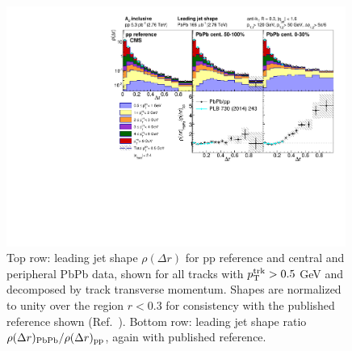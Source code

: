 \begin{figure}[h!]
\begin{center} 
\includegraphics[width=0.99\textwidth]{figures/Results/JetShapes_WithHighpT_PAS.pdf}
\caption[Leading jet shape at 2.76 TeV, shown differentially in $p_{\rm T}^{\rm trk}$]{Top row:  leading jet shape $\rho(\Delta r)$ for pp reference and central and peripheral PbPb data, shown for all tracks with $p_{\rm T}^{\rm trk} > 0.5$ GeV and decomposed by track transverse momentum.  Shapes are normalized to unity over the region $r<0.3$ for consistency with the published reference shown (Ref.~\cite{Chatrchyan:2013kwa}).  Bottom row:  leading jet shape ratio $\rho(\Delta r)_{\rm PbPb}/\rho(\Delta r)_{\rm pp}$, again with published reference.  }
\label{fig:JetShape_Leading} 
\end{center} 
\end{figure} 



